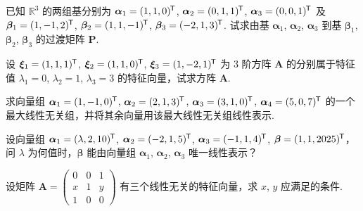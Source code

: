 \documentclass[fontset = fandol]{ctexart}
\newcommand*\mat[1]{\mathbf{#1}}
\newcommand*\trans[1]{#1^{\mkern-1.5mu\mathsf{T}}}
\begin{document}
\begin{problem}
  已知 $\mathbb R^3$ 的两组基分别为 $\bm\alpha_1 = \trans{(1,1,0)}$,
  $\bm\alpha_2 = \trans{(0,1,1)}$, $\bm\alpha_3 = \trans{(0,0,1)}$ 及
  $\bm\beta_1 = \trans{(1,-1,2)}$, $\bm\beta_2 = \trans{(1,1,-1)}$,
  $\bm\beta_3 = \trans{(-2,1,3)}$. 试求由基 $\bm\alpha_1$, $\bm\alpha_2$,
  $\bm\alpha_3$ 到基 $\bm\beta_1$, $\bm\beta_2$, $\bm\beta_3$ 的过渡矩阵 $\mat P$.
\end{problem}
\begin{solution}
  
\end{solution}

\begin{problem}
  设 $\bm\xi_1 = \trans{(1,1,1)}$, $\bm\xi_2 = \trans{(1,1,0)}$,
  $\bm\xi_3 = \trans{(1,-2,1)}$ 为 $3$ 阶方阵 $\mat A$ 的分别属于特征值
  $\lambda_1 = 0$, $\lambda_2 = 1$, $\lambda_3 = 3$ 的特征向量，试求方阵 $\mat A$.
\end{problem}
\begin{solution}
  
\end{solution}

\begin{problem}
  求向量组 $\bm\alpha_1 = \trans{(1,-1,0)}$, $\bm\alpha_2 = \trans{(2,1,3)}$, $\bm\alpha_3 = \trans{(3,1,0)}$, $\bm\alpha_4 = \trans{(5,0,7)}$ 的一个最大线性无关组，并将其余向量用该最大线性无关组线性表示.
\end{problem}
\begin{solution}
  
\end{solution}

\begin{problem}
  设向量组 $\bm\alpha_1 = \trans{(\lambda,2,10)}$,
  $\bm\alpha_2 = \trans{(-2,1,5)}$, $\bm\alpha_3 = \trans{(-1,1,4)}$,
  $\bm\beta = \trans{(1,1,2025)}$，问 $\lambda$ 为何值时，$\bm\beta$ 能由向量组
  $\bm\alpha_1$, $\bm\alpha_2$, $\bm\alpha_3$ 唯一线性表示？
\end{problem}
\begin{solution}
  
\end{solution}

\begin{problem}
  设矩阵 $\mat A =
  \begin{pmatrix}
    0 & 0 & 1\\
    x & 1 & y\\
    1 & 0 & 0
  \end{pmatrix}$
  有三个线性无关的特征向量，求 $x$, $y$ 应满足的条件.
\end{problem}
\begin{solution}
  
\end{solution}
\end{document}
